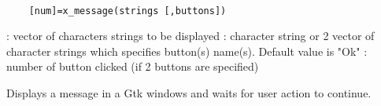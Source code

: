 \begin{mandesc}
  \\ %
\end{mandesc}
\label{x-message}
\begin{calling_sequence}
  \begin{verbatim}
    [num]=x_message(strings [,buttons])   
  \end{verbatim}
\end{calling_sequence}
\begin{parameters}
  \begin{varlist}
    : vector of characters strings to be displayed
    : character string or 2 vector of character strings which specifies button(s) name(s). Default value is "Ok"
    : number  of button clicked (if 2 buttons are specified)
  \end{varlist}
\end{parameters}
\begin{mandescription}
  Displays a message in a Gtk windows and waits for user action to continue. 
\end{mandescription}
\begin{examples}
  \begin{program}
  \end{program}
\end{examples}
\begin{manseealso}
\end{manseealso}

